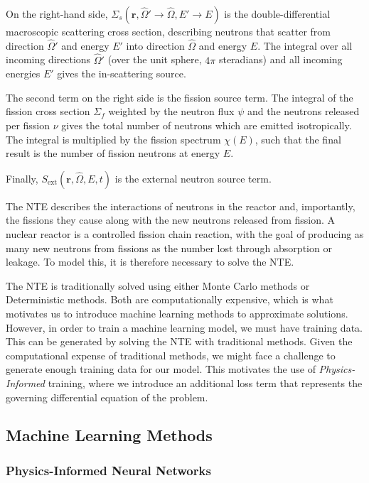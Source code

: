 \documentclass[%
 reprint,
 amsmath,amssymb,
 aps,
]{revtex4-1}
\begin{document}
On the right-hand side, $\Sigma_s(\mathbf{r},\hat{\Omega}'\to\hat{\Omega},E'\to E)$ is the double-differential macroscopic scattering cross
section, describing neutrons that scatter from direction $\hat{\Omega}'$ and energy $E'$ into direction $\hat{\Omega}$ and energy $E$.
The integral over all incoming directions $\hat{\Omega}'$ (over the unit sphere, $4\pi$ steradians) and all incoming energies $E'$ gives
the in-scattering source.

The second term on the right side is the fission source term. The integral of the fission cross section $\Sigma_f$ weighted by the neutron flux
$\psi$ and the neutrons released per fission $\nu$ gives the total number of neutrons which are emitted isotropically. The integral is multiplied
by the fission spectrum $\chi(E)$, such that the final result is the number of fission neutrons at energy $E$.

Finally, $S_\text{ext}(\mathbf{r},\hat{\Omega},E,t)$ is the external neutron source term.

The NTE describes the interactions of neutrons in the reactor and, importantly, the fissions they cause along with the new neutrons
released from fission. A nuclear reactor is a controlled fission chain reaction, with the goal of producing as many new neutrons from fissions
as the number lost through absorption or leakage. To model this, it is therefore necessary to solve the NTE.

The NTE is traditionally solved using either Monte Carlo methods or Deterministic methods. Both are computationally expensive, which is what
motivates us to introduce machine learning methods to approximate solutions. However, in order to train a machine learning model, we must have
training data. This can be generated by solving the NTE with traditional methods. Given the computational expense of traditional methods, we
might face a challenge to generate enough training data for our model. This motivates the use of \textit{Physics-Informed} training, where we
introduce an additional loss term that represents the governing differential equation of the problem.

\subsection{Machine Learning Methods}

\subsubsection{Physics-Informed Neural Networks}
\end{document}
